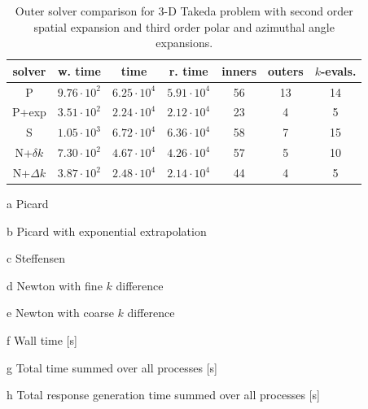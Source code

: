 \begin{table}[ht] 
 \begin{center} 
 \caption{Outer solver comparison for 3-D Takeda problem with second order 
          spatial expansion and third order polar and azimuthal angle 
          expansions.} 
 \label{tbl:takeda_outer_study} 
  \begin{threeparttable}
 \begin{tabular}{ccccccc} 
 \toprule 
  solver & w. time\tnote{f} & time\tnote{g} & r. time\tnote{h} & inners & outers & $k$-evals. \\
  \midrule
    P\tnote{a}            &  $9.76\cdot 10^2$ &  $6.25\cdot 10^4$ &  $5.91\cdot 10^4$ &           56 &           13 &           14 \\ 
    P+exp\tnote{b}       &  $3.51\cdot 10^2$ &  $2.24\cdot 10^4$ &  $2.12\cdot 10^4$ &           23 &        4 &   5  \\ 
    S\tnote{c}            &  $1.05\cdot 10^3$ &  $6.72\cdot 10^4$ &  $6.36\cdot 10^4$ &           58 &            7 &           15 \\ 
    N+$\delta k$\tnote{d}&  $7.30\cdot 10^2$ &  $4.67\cdot 10^4$ &  $4.26\cdot 10^4$ &           57 &            5 &           10 \\ 
    N+$\Delta k$\tnote{e}&  $3.87\cdot 10^2$ &  $2.48\cdot 10^4$ &  $2.14\cdot 10^4$ &           44 &          4 &           5  \\ 
 \bottomrule 
 \end{tabular} 
 
 
 {\footnotesize
 \begin{tablenotes}
   \item[a] Picard 
   \item[b] Picard with exponential extrapolation
   \item[c] Steffensen
   \item[d] Newton with fine $k$ difference
   \item[e] Newton with coarse $k$ difference
   \item[f] Wall time [s]
   \item[g] Total time summed over all processes [s]
   \item[h] Total response generation time summed over all processes [s]
 \end{tablenotes}
 }
 
 \end{threeparttable}
 
 \end{center} 
\end{table} 


